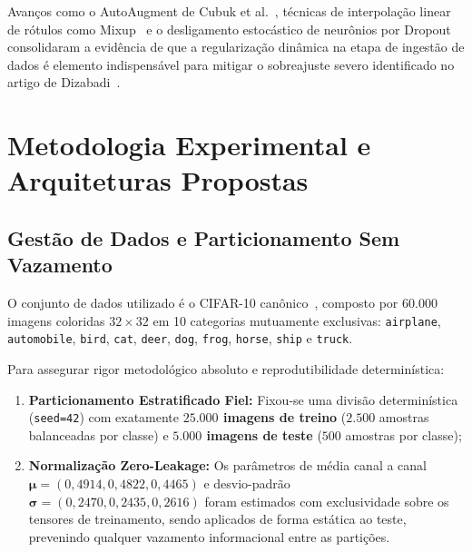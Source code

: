 \documentclass[runningheads]{llncs}
\begin{document}
Avan\c{c}os como o AutoAugment de Cubuk et al.~\cite{cubuk2019autoaugment}, t\'{e}cnicas de interpola\c{c}\~{a}o linear de r\'{o}tulos como Mixup~\cite{zhang2018mixup} e o desligamento estoc\'{a}stico de neur\^{o}nios por Dropout~\cite{srivastava2014dropout} consolidaram a evid\^{e}ncia de que a regulariza\c{c}\~{a}o din\^{a}mica na etapa de ingest\~{a}o de dados \'{e} elemento indispens\'{a}vel para mitigar o sobreajuste severo identificado no artigo de Dizabadi~\cite{dizabadi2026empirical}.

\section{Metodologia Experimental e Arquiteturas Propostas}
\label{sec:metodologia}

\subsection{Gest\~{a}o de Dados e Particionamento Sem Vazamento}
O conjunto de dados utilizado \'{e} o CIFAR-10 can\^{o}nico~\cite{krizhevsky2009learning}, composto por $60.000$ imagens coloridas $32 \times 32$ em 10 categorias mutuamente exclusivas: \texttt{airplane}, \texttt{automobile}, \texttt{bird}, \texttt{cat}, \texttt{deer}, \texttt{dog}, \texttt{frog}, \texttt{horse}, \texttt{ship} e \texttt{truck}.

Para assegurar rigor metodol\'{o}gico absoluto e reprodutibilidade determin\'{i}stica:
\begin{enumerate}
    \item \textbf{Particionamento Estratificado Fiel:} Fixou-se uma divis\~{a}o determin\'{i}stica (\texttt{seed=42}) com exatamente \textbf{$25.000$ imagens de treino} ($2.500$ amostras balanceadas por classe) e \textbf{$5.000$ imagens de teste} ($500$ amostras por classe);
    \item \textbf{Normaliza\c{c}\~{a}o Zero-Leakage:} Os par\^{a}metros de m\'{e}dia canal a canal $\boldsymbol{\mu} = (0{,}4914, 0{,}4822, 0{,}4465)$ e desvio-padr\~{a}o $\boldsymbol{\sigma} = (0{,}2470, 0{,}2435, 0{,}2616)$ foram estimados com exclusividade sobre os tensores de treinamento, sendo aplicados de forma est\'{a}tica ao teste, prevenindo qualquer vazamento informacional entre as parti\c{c}\~{o}es.
\end{enumerate}
\end{document}
